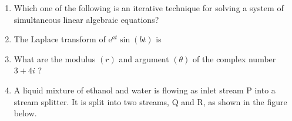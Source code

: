 \documentclass[journal,12pt,onecolumn]{IEEEtran}
\theoremstyle{remark}
\begin{document}
\begin{enumerate}
\item Which one of the following is an iterative technique for solving a system of simultaneous linear algebraic equations?
\hfill{}
    \begin{enumerate}
    \end{enumerate}

    \item The Laplace transform of $\mathrm{e}^{at} \sin (bt)$ is
    \hfill{}
    \begin{enumerate}
    \end{enumerate}

    \item What are the modulus $(r)$ and argument $(\theta)$ of the complex number $3+4i$ ?
    \hfill{}
    \begin{enumerate}
    \end{enumerate}

    \item A liquid mixture of ethanol and water is flowing as inlet stream P into a stream splitter. It is split into two streams, Q and R, as shown in the figure below.
    

\end{enumerate}
\end{document}
